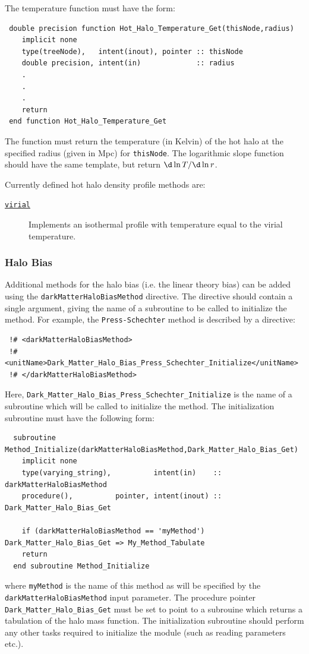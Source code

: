 The temperature function must have the form:
\begin{verbatim}
 double precision function Hot_Halo_Temperature_Get(thisNode,radius)
    implicit none
    type(treeNode),   intent(inout), pointer :: thisNode
    double precision, intent(in)             :: radius
    .
    .
    .
    return
 end function Hot_Halo_Temperature_Get
\end{verbatim}
The function must return the temperature (in Kelvin) of the hot halo at the specified radius (given in Mpc) for {\tt thisNode}. The logarithmic slope function should have the same template, but return $\d\ln T / \d \ln r$.

Currently defined hot halo density profile methods are:
\begin{description}
 \item [\hyperlink{hot_halo.temperature_profile.virial.F90:hot_halo_temperature_profile_virial:hot_halo_temperature_virial_get}{{\tt virial}}] Implements an isothermal profile with temperature equal to the virial temperature.
\end{description}

\subsubsection{Halo Bias}

Additional methods for the halo bias (i.e. the linear theory bias) can be added using the {\tt darkMatterHaloBiasMethod} directive. The directive should contain a single argument, giving the name of a subroutine to be called to initialize the method. For example, the {\tt Press-Schechter} method is described by a directive:
\begin{verbatim}
 !# <darkMatterHaloBiasMethod>
 !#  <unitName>Dark_Matter_Halo_Bias_Press_Schechter_Initialize</unitName>
 !# </darkMatterHaloBiasMethod>
\end{verbatim}
Here, {\tt Dark\_Matter\_Halo\_Bias\_Press\_Schechter\_Initialize} is the name of a subroutine which will be called to initialize the method. The initialization subroutine must have the following form:
\begin{verbatim}
  subroutine Method_Initialize(darkMatterHaloBiasMethod,Dark_Matter_Halo_Bias_Get)
    implicit none
    type(varying_string),          intent(in)    :: darkMatterHaloBiasMethod
    procedure(),          pointer, intent(inout) :: Dark_Matter_Halo_Bias_Get
    
    if (darkMatterHaloBiasMethod == 'myMethod') Dark_Matter_Halo_Bias_Get => My_Method_Tabulate
    return
  end subroutine Method_Initialize
\end{verbatim}
where {\tt myMethod} is the name of this method as will be specified by the {\tt darkMatterHaloBiasMethod} input parameter. The procedure pointer {\tt Dark\_Matter\_Halo\_Bias\_Get} must be set to point to a subrouine which returns a tabulation of the halo mass function. The initialization subroutine should perform any other tasks required to initialize the module (such as reading parameters etc.).

